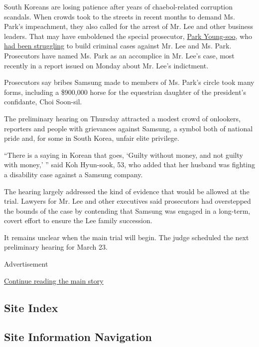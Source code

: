 South Koreans are losing patience after years of chaebol-related
corruption scandals. When crowds took to the streets in recent months to
demand Ms. Park's impeachment, they also called for the arrest of Mr.
Lee and other business leaders. That may have emboldened the special
prosecutor,
\href{https://www.nytimes3xbfgragh.onion/2017/03/06/world/asia/president-park-geun-hye-bribery-korea.html}{Park
Young-soo}, who
\href{https://www.nytimes3xbfgragh.onion/2017/01/18/world/asia/samsung-korea-president-impeachment.html}{had
been struggling} to build criminal cases against Mr. Lee and Ms. Park.
Prosecutors have named Ms. Park as an accomplice in Mr. Lee's case, most
recently in a report issued on Monday about Mr. Lee's indictment.

Prosecutors say bribes Samsung made to members of Ms. Park's circle took
many forms, including a \$900,000 horse for the equestrian daughter of
the president's confidante, Choi Soon-sil.

The preliminary hearing on Thursday attracted a modest crowd of
onlookers, reporters and people with grievances against Samsung, a
symbol both of national pride and, for some in South Korea, unfair elite
privilege.

``There is a saying in Korean that goes, `Guilty without money, and not
guilty with money,' '' said Koh Hyun-sook, 53, who added that her
husband was fighting a disability case against a Samsung company.

The hearing largely addressed the kind of evidence that would be allowed
at the trial. Lawyers for Mr. Lee and other executives said prosecutors
had overstepped the bounds of the case by contending that Samsung was
engaged in a long-term, covert effort to ensure the Lee family
succession.

It remains unclear when the main trial will begin. The judge scheduled
the next preliminary hearing for March 23.

Advertisement

\protect\hyperlink{after-bottom}{Continue reading the main story}

\hypertarget{site-index}{%
\subsection{Site Index}\label{site-index}}

\hypertarget{site-information-navigation}{%
\subsection{Site Information
Navigation}\label{site-information-navigation}}

